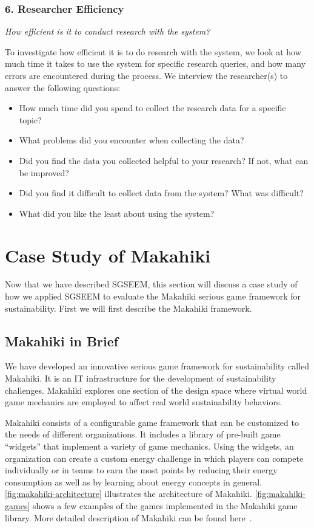 \documentclass{sigchi}
\begin{document}
\subsubsection{6. Researcher Efficiency}

\emph{How efficient is it to conduct research with the system?}

To investigate how efficient it is to do research with the system, we
look at how much time it takes to use the system for specific research
queries, and how many errors are encountered during the process. We
interview the researcher(s) to answer the following questions:
\begin{itemize}
\item How much time did you spend to collect the research data for a
  specific topic?
\item What problems did you encounter when collecting the data?
\item Did you find the data you collected helpful to your research? If
  not, what can be improved?
\item Did you find it difficult to collect data from the system?
  What was difficult?
\item What did you like the least about using the system?
\end{itemize}

\section{Case Study of Makahiki}

Now that we have described SGSEEM, this section will discuss
a case study of how we applied SGSEEM to evaluate the Makahiki serious
game framework for sustainability. First we will first describe the
Makahiki framework.

\subsection{Makahiki in Brief}

We have developed an innovative serious game framework for sustainability
called Makahiki. It is an IT infrastructure for the development of
sustainability challenges. Makahiki explores one section of the design
space where virtual world game mechanics are employed to affect real
world sustainability behaviors.

Makahiki consists of a configurable game framework that can be customized
to the needs of different organizations. It includes a library of
pre-built game ``widgets'' that implement a variety of game mechanics.
Using the widgets, an organization can create a custom energy %
challenge in which players can compete individually or in teams to
earn the most points by reducing their energy consumption as well as
by learning about energy concepts in general. \autoref{fig:makahiki-architecture} illustrates the architecture of
Makahiki. \autoref{fig:makahiki-games} shows a few examples of the
games implemented in the Makahiki game library. More detailed
description of Makahiki can be found here~\cite{csdl2-12-06}.
\end{document}
